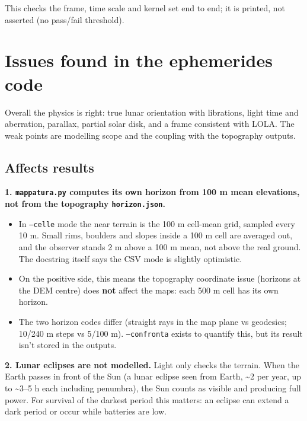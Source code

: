 \documentclass[11pt,a4paper]{article}
\providecommand{\tightlist}{\setlength{\itemsep}{0pt}\setlength{\parskip}{0pt}}
\begin{document}
This checks the frame, time scale and kernel set end to end; it is
printed, not asserted (no pass/fail threshold).

\hypertarget{issues-found-in-the-ephemerides-code}{%
\section{Issues found in the ephemerides
code}\label{issues-found-in-the-ephemerides-code}}

Overall the physics is right: true lunar orientation with librations,
light time and aberration, parallax, partial solar disk, and a frame
consistent with LOLA. The weak points are modelling scope and the
coupling with the topography outputs.

\hypertarget{affects-results}{%
\subsection{Affects results}\label{affects-results}}

\textbf{1. \texttt{mappatura.py} computes its own
horizon from 100 m mean elevations, not from the topography
\texttt{horizon.json}.}

\begin{itemize}
\tightlist
\item
  In \texttt{--celle} mode the near terrain is the 100
  m cell-mean grid, sampled every 10 m. Small rims, boulders and slopes
  inside a 100 m cell are averaged out, and the observer stands 2 m
  above a 100 m mean, not above the real ground. The docstring itself
  says the CSV mode is slightly optimistic.
\item
  On the positive side, this means the topography coordinate issue
  (horizons at the DEM centre) does \textbf{not} affect the maps: each
  500 m cell has its own horizon.
\item
  The two horizon codes differ (straight rays in the map plane vs
  geodesics; 10/240 m steps vs 5/100 m).
  \texttt{--confronta} exists to quantify this, but its
  result isn't stored in the outputs.
\end{itemize}

\textbf{2. Lunar eclipses are not modelled.} Light only checks the
terrain. When the Earth passes in front of the Sun (a lunar eclipse seen
from Earth, \textasciitilde2 per year, up to \textasciitilde3--5 h each
including penumbra), the Sun counts as visible and producing full power.
For survival of the darkest period this matters: an eclipse can extend a
dark period or occur while batteries are low.
\end{document}
